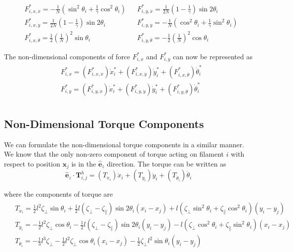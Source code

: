 \documentclass[12pt,letterpaper,titlepage]{article}
\newcommand{\uvec}[1]{\mathbf{\hat{#1}}}
\begin{document}
\begin{align*}
&F_{i,x,\dot{x}}^* = - \frac{1}{N} ( \sin^2 \theta_i + \frac{1}{\gamma} \cos^2 \theta_i) & &F_{i,y,\dot{x}}^* = \frac{1}{2N} (1 - \frac{1}{\gamma} ) \sin 2 \theta_i \\
&F_{i,x,\dot{y}}^* = \frac{1}{2N} (1 - \frac{1}{\gamma} ) \sin 2 \theta_i & &F_{i,y,\dot{y}}^* =  - \frac{1}{N} ( \cos^2 \theta_i + \frac{1}{\gamma} \sin^2 \theta_i) \\
&F_{i,x,\dot{\theta}}^* = \frac{1}{2} (\frac{1}{N})^2 \sin \theta_i & &F_{i,y,\dot{\theta}}^* = - \frac{1}{2} (\frac{1}{N})^2 \cos \theta_i
\end{align*}

The non-dimensional components of force $F_{i,x}^*$ and $F_{i,y}^*$ can now be represented as
\begin{align}
\begin{split}
&F_{i,x}^* = (F_{i,x,\dot{x}}^*) \dot{x}_i^* + (F_{i,x,\dot{y}}^*) \dot{y}_i^* + (F_{i,x,\dot{\theta}}^*) \dot{\theta}_i^* \\
&F_{i,y}^* = (F_{i,y,\dot{x}}^*) \dot{x}_i^* + (F_{i,y,\dot{y}}^*) \dot{y}_i^* + (F_{i,y,\dot{\theta}}^*) \dot{\theta}_i^* \\
\end{split}
\end{align}

\newpage

\subsection{Non-Dimensional Torque Components}
We can formulate the non-dimensional torque components in a similar manner. We know that the only non-zero component of torque acting on filament $i$ with respect to position $\mathbf{x}_j$ is in the $\uvec{e}_z$ direction. The torque can be written as
\begin{equation}
\uvec{e}_z \cdot \mathbf{T}_{i,j}^h = (T_{\dot{x}_i}) \dot{x}_i + (T_{\dot{y}_i}) \dot{y}_i + (T_{\dot{\theta}_i}) \dot{\theta}_i
\end{equation}

where the components of torque are
\begin{align}
\begin{split}
&T_{\dot{x}_i} = \frac{1}{2} l^2 \zeta_{\bot} \sin \theta_i + \frac{1}{2} l (\zeta_{\bot} - \zeta_{\parallel}) \sin 2 \theta_i (x_i - x_j) + l (\zeta_{\bot} \sin^2 \theta_i + \zeta_{\parallel} \cos^2 \theta_i)(y_i - y_j) \\
&T_{\dot{y}_i} = - \frac{1}{2} l^2 \zeta_{\bot} \cos \theta_i - \frac{1}{2} l (\zeta_{\bot} - \zeta_{\parallel}) \sin 2 \theta_i (y_i - y_j) - l (\zeta_{\bot}\cos^2 \theta_i + \zeta_{\parallel} \sin^2 \theta_i)(x_i - x_j) \\
&T_{\dot{\theta}_i} = - \frac{1}{3} l^3 \zeta_{\bot} - \frac{1}{2} l^2 \zeta_{\bot} \cos \theta_i (x_i - x_j) - \frac{1}{2} \zeta_{\bot} l^2 \sin \theta_i (y_i - y_j)
\end{split}
\end{align}
\end{document}
